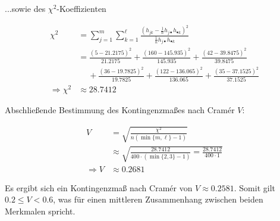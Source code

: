 ...sowie des $\chi^2$-Koeffizienten

$$
\begin{aligned}
    \chi^2 &= \sum_{j=1}^m \sum_{k=1}^\ell \frac{(h_{jk} - \frac1n h_{j\bullet} h_{\bullet k})^2}{\frac1n h_{j\bullet} h_{\bullet k}} \\
    &= \frac{(5-21.2175)^2}{21.2175} + \frac{(160-145.935)^2}{145.935} + \frac{(42-39.8475)^2}{39.8475} \\
    & \quad~ + \frac{(36-19.7825)^2}{19.7825} + \frac{(122-136.065)^2}{136.065} + \frac{(35-37.1525)^2}{37.1525} \\
    \Rightarrow \chi^2 &\approx 28.7412
\end{aligned}
$$

Abschließende Bestimmung des Kontingenzmaßes nach Cramér $V$:

$$
\begin{aligned}
    V &= \sqrt{\frac{\chi^2}{n (\min\lbrace m,\ell \rbrace - 1)}} \\
    &\approx \sqrt{\frac{28.7412}{400 \cdot (\min\lbrace2,3\rbrace - 1)} = \frac{28.7412}{400 \cdot 1}} \\
    \Rightarrow V &\approx 0.2681
\end{aligned}
$$

Es ergibt sich ein Kontingenzmaß nach Cramér von $V\approx0.2581$. Somit gilt $0.2\le V<0.6$, was für einen mittleren Zusammenhang zwischen beiden Merkmalen spricht.
